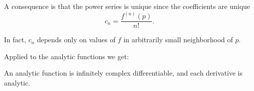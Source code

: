 \documentclass[10pt,aspectratio=169]{beamer}
\begin{document}
\begin{frame}

A consequence is that the power series is unique since
the coefficients are unique
\[
c_n =
\frac{f^{(n)}(p)}{n!} .
\]

\medskip
\pause

In fact, $c_n$ depends only on values of $f$ in arbitrarily small
neighborhood of $p$.

\medskip
\pause

Applied to the analytic functions we get:

\begin{corollary}
An analytic function is infinitely complex differentiable, and each
derivative is analytic.
\end{corollary}

\end{frame}
\end{document}
